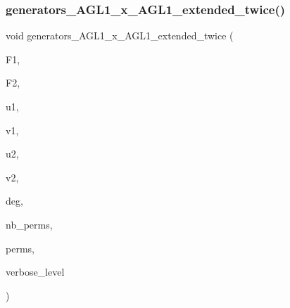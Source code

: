 \subsubsection{\texorpdfstring{generators\+\_\+\+A\+G\+L1\+\_\+x\+\_\+\+A\+G\+L1\+\_\+extended\+\_\+twice()}{generators\_AGL1\_x\_AGL1\_extended\_twice()}}
{\footnotesize\ttfamily void generators\+\_\+\+A\+G\+L1\+\_\+x\+\_\+\+A\+G\+L1\+\_\+extended\+\_\+twice (\begin{DoxyParamCaption}\item[{\mbox{\hyperlink{classfinite__field}{finite\+\_\+field}} \&}]{F1,  }\item[{\mbox{\hyperlink{classfinite__field}{finite\+\_\+field}} \&}]{F2,  }\item[{\mbox{\hyperlink{galois_8h_a09fddde158a3a20bd2dcadb609de11dc}{I\+NT}}}]{u1,  }\item[{\mbox{\hyperlink{galois_8h_a09fddde158a3a20bd2dcadb609de11dc}{I\+NT}}}]{v1,  }\item[{\mbox{\hyperlink{galois_8h_a09fddde158a3a20bd2dcadb609de11dc}{I\+NT}}}]{u2,  }\item[{\mbox{\hyperlink{galois_8h_a09fddde158a3a20bd2dcadb609de11dc}{I\+NT}}}]{v2,  }\item[{\mbox{\hyperlink{galois_8h_a09fddde158a3a20bd2dcadb609de11dc}{I\+NT}} \&}]{deg,  }\item[{\mbox{\hyperlink{galois_8h_a09fddde158a3a20bd2dcadb609de11dc}{I\+NT}} \&}]{nb\+\_\+perms,  }\item[{\mbox{\hyperlink{galois_8h_a09fddde158a3a20bd2dcadb609de11dc}{I\+NT}} $\ast$\&}]{perms,  }\item[{\mbox{\hyperlink{galois_8h_a09fddde158a3a20bd2dcadb609de11dc}{I\+NT}}}]{verbose\+\_\+level }\end{DoxyParamCaption})}

\mbox{\label{group__generators_8_c_a3e0f2ae60353a1eefcbda26393c6eb50}} 
